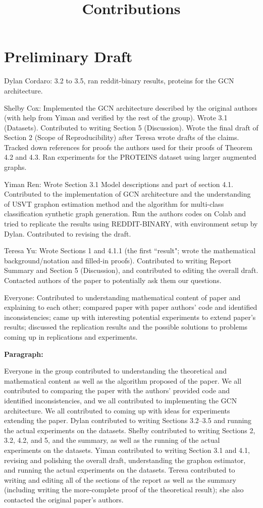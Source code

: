 \documentclass[12pt]{amsart}
\title{Contributions}
\begin{document}
\maketitle

\section{Preliminary Draft}

Dylan Cordaro: 3.2 to 3.5, ran reddit-binary results, proteins for the GCN architecture. 


Shelby Cox: Implemented the GCN architecture described by the original authors (with help from Yiman and verified by the rest of the group). Wrote 3.1 (Datasets). Contributed to writing Section 5 (Discussion). Wrote the final draft of Section 2 (Scope of Reproducibility) after Teresa wrote drafts of the claims. Tracked down references for proofs the authors used for their proofs of Theorem 4.2 and 4.3. Ran experiments for the PROTEINS dataset using larger augmented graphs.


Yiman Ren: Wrote Section 3.1 Model descriptions and part of section 4.1. Contributed to the implementation of GCN architecture and the understanding of USVT graphon estimation method and the algorithm for multi-class classification synthetic graph generation. Run the authors codes on Colab and tried to replicate the results using REDDIT-BINARY, with environment setup by Dylan. Contributed to revising the draft. 


Teresa Yu: Wrote Sections 1 and 4.1.1 (the first ``result"; wrote the mathematical background/notation and filled-in proofs). Contributed to writing Report Summary and Section 5 (Discussion), and contributed to editing the overall draft. Contacted authors of the paper to potentially ask them our questions.


Everyone: Contributed to understanding mathematical content of paper and explaining to each other; compared paper with paper authors' code and identified inconsistencies; came up with interesting potential experiments to extend paper's results; discussed the replication results and the possible solutions to problems coming up in replications and experiments.

\textbf{Paragraph:}

Everyone in the group contributed to understanding the theoretical and mathematical content as well as the algorithm proposed of the paper. We all contributed to comparing the paper with the authors' provided code and identified inconsistencies, and we all contributed to implementing the GCN architecture. We all contributed to coming up with ideas for experiments extending the paper. Dylan contributed to writing Sections 3.2--3.5 and running the actual experiments on the datasets. Shelby contributed to writing Sections 2, 3.2, 4.2, and 5, and the summary, as well as the running of the actual experiments on the datasets. Yiman contributed to writing Section 3.1 and 4.1, revising and polishing the overall draft, understanding the graphon estimator, and running the actual experiments on the datasets. Teresa contributed to writing and editing all of the sections of the report as well as the summary (including writing the more-complete proof of the theoretical result); she also contacted the original paper's authors.
\end{document}
